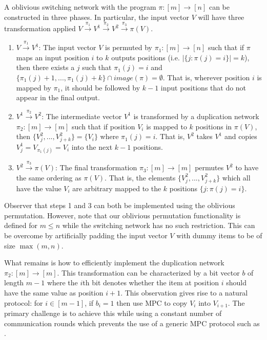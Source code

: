 A oblivious switching network with the program $\pi : [m]\rightarrow [n]$ can be constructed in three phases\cite{MS13, CMRS18}. In particular, the input vector $V$ will have three transformation applied $V\overset{\pi_1}{\rightarrow}V^1\overset{\pi_2}{\rightarrow}V^2\overset{\pi_3}{\rightarrow}\pi(V)$.
\begin{enumerate}
	\item $V\overset{\pi_1}{\rightarrow}V^1$:  The input vector $V$ is permuted by $\pi_1:[m]\rightarrow[n]$ such that if $\pi$ maps an input position $i$ to $k$ outputs positions (i.e. $|\{ j : \pi(j)=i \}| = k$), then there exists a $j$ such that $\pi_1(j)=i$  and $\{\pi_1(j)+ 1,...,\pi_1(j )+k \} \cap image(\pi) = \emptyset$. That is, wherever position $i$ is mapped by $\pi_1$, it should be followed by $k-1$ input positions that do not appear in the final output.
	
	\item $V^1\overset{\pi_2}{\rightarrow}V^2$: The intermediate vector $V^1$ is transformed by a duplication network $\pi_2:[m]\rightarrow[m]$ such that if position $V_i$ is mapped to $k$ positions in $\pi(V)$, then $\{ V^2_{j},...,V^2_{j+k}\} = \{V_i\}$ where $\pi_1(j)=i$. That is, $V^2$ takes $V^1$ and copies $V^1_{j}=V_{\pi_1(j)}=V_i$ into the next $k-1$ positions. 
	
	\item $V^2\overset{\pi_3}{\rightarrow}\pi(V)$: The final transformation $\pi_3:[m]\rightarrow[m]$  permutes $V^2$ to have the same ordering as $\pi(V)$. That is, the elements $\{ V^2_{j},...,V^2_{j+k}\}$ which all have the value  $V_i$ are arbitrary mapped to the $k$ positions $\{ j : \pi(j)=i \}$.
\end{enumerate}
Observer that steps 1 and 3 can both be implemented using the oblivious permutation. However, note that our oblivious permutation functionality is defined for $m\leq n$ while the switching network has no such restriction. This can be overcome by artificially padding the input vector $V$ with dummy items to be of size $\max(m, n)$. 

What remains is how to efficiently implement the duplication network $\pi_2:[m]\rightarrow[m]$. This transformation can be characterized by a bit vector $b$ of length $m-1$ where the $i$th bit denotes whether the item at position $i$ should have the same value as position $i+1$. This observation gives rise to a natural protocol: for $i\in [m-1]$, if $b_i=1$ then use MPC to copy $V_i$ into $V_{i+1}$. The primary challenge is to achieve this while using a constant number of communication rounds which prevents the use of a generic MPC protocol such as \cite{aby3, highthroughput}.

